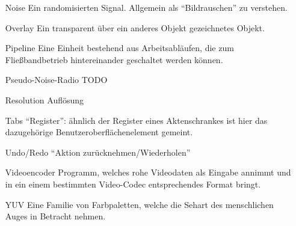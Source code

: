 \begin{itemize}
    \item[Noise] Ein randomisierten Signal. Allgemein als ``Bildrauschen'' zu verstehen.
    \item[Overlay] Ein transparent über ein anderes Objekt gezeichnetes Objekt.
    \item[Pipeline] Eine Einheit bestehend aus Arbeitsabläufen, die zum Fließbandbetrieb hintereinander geschaltet werden können.
    \item[Pseudo-Noise-Radio] TODO %
    \item[Resolution] Auflösung
    \item[Tabs] ``Register'': ähnlich der Register eines Aktenschrankes ist hier das dazugehörige Benutzeroberflächenelement gemeint.
    \item[Undo/Redo] ``Aktion zurücknehmen/Wiederholen''
    \item[Videoencoder] Programm, welches rohe Videodaten als Eingabe annimmt und in ein einem bestimmten Video-Codec entsprechendes Format bringt.
    \item[YUV] Eine Familie von Farbpaletten, welche die Sehart des menschlichen Auges in Betracht nehmen.
\end{itemize}
